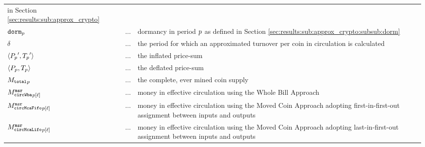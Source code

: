 \begin{landscape}
\begin{table}[ht]
\begin{tabular}{lll}
                                          in Section \ref{sec:results:sub:approx_crypto}\\%
      $\mathtt{dorm}_{p}$                  & $\hdots{}$ &  dormancy in period \({p}\) as defined in
                                          Section \ref{sec:results:sub:approx_crypto:subsub:dorm}\\%
      $\delta$                  & $\hdots{}$ &  the period for which an approximated turnover per coin in circulation is calculated\\%
      $\langle{P_{p}}',{T_{p}}'\rangle$ & $\hdots{}$ &  the inflated price-sum \\%
      $\langle{P_{p}} ,{T_{p}}\rangle$  & $\hdots{}$ &  the deflated price-sum \\%
      ${{M_{\mathtt{total}}}_{p}}$                & $\hdots{}$ &  the complete, ever mined coin supply\\%
      ${{M_{\mathtt{circWba}}^{\mathtt{msr}}}_{{p}[{\ell}]}}$          & $\hdots{}$ &  money in effective circulation using the Whole Bill Approach\\%
      ${{M_{\mathtt{circMcaFifo}}^{\mathtt{msr}}}_{{p}[{\ell}]}}$          & $\hdots{}$ &  money in effective circulation using the Moved Coin Approach
                                          adopting first-in-first-out assignment between inputs and outputs\\%
      ${{M_{\mathtt{circMcaLifo}}^{\mathtt{msr}}}_{{p}[{\ell}]}}$          & $\hdots{}$ &  money in effective circulation using the Moved Coin Approach
                                          adopting last-in-first-out assignment between inputs and outputs%
    \end{tabular}%
  \end{table}%
  \capstarttrue
\end{landscape}%

